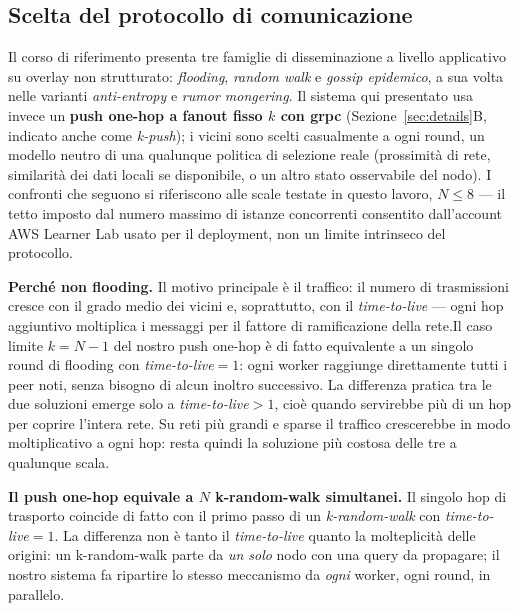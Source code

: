 \subsection{Scelta del protocollo di comunicazione}
Il corso di riferimento presenta tre famiglie di disseminazione a livello
applicativo su overlay non strutturato: \emph{flooding},
\emph{random walk} e \emph{gossip epidemico}, a sua volta nelle
varianti \emph{anti-entropy} e \emph{rumor mongering}. Il sistema qui
presentato usa invece un
\textbf{push one-hop a fanout fisso $k$ con grpc} (Sezione~\ref{sec:details}B, indicato
anche come \emph{k-push}); i vicini sono scelti casualmente a ogni round,
un modello neutro di una qualunque politica di selezione reale (prossimità
di rete, similarità dei dati locali se disponibile, o un altro stato osservabile del nodo). I confronti
che seguono si riferiscono alle scale testate in questo lavoro, $N\le8$ — il
tetto imposto dal numero massimo di istanze concorrenti consentito
dall'account AWS Learner Lab usato per il deployment, non un limite
intrinseco del protocollo.

\textbf{Perché non flooding.} Il motivo principale è il traffico: il numero
di trasmissioni cresce con il grado medio dei vicini e, soprattutto, con il
\emph{time-to-live} — ogni hop aggiuntivo moltiplica i messaggi per il
fattore di ramificazione della rete.Il
caso limite $k=N-1$ del nostro push one-hop è di fatto equivalente a un singolo round di flooding con
\emph{time-to-live}$=1$: ogni worker raggiunge direttamente tutti i peer
noti, senza bisogno di alcun inoltro successivo. La differenza pratica tra le
due soluzioni emerge solo a \emph{time-to-live}$>1$, cioè quando servirebbe
più di un hop per coprire l'intera rete. Su reti più grandi e sparse il traffico
crescerebbe in modo moltiplicativo a ogni hop: resta quindi la soluzione più
costosa delle tre a qualunque scala.

\textbf{Il push one-hop equivale a $N$ k-random-walk simultanei.} Il singolo hop di trasporto coincide di
fatto con il primo passo di un \emph{k-random-walk} con
\emph{time-to-live}$=1$. La differenza non è tanto il \emph{time-to-live} quanto la molteplicità delle origini: un
k-random-walk parte da \emph{un solo} nodo con una query da propagare; il
nostro sistema fa ripartire lo stesso meccanismo da \emph{ogni} worker, ogni
round, in parallelo.

